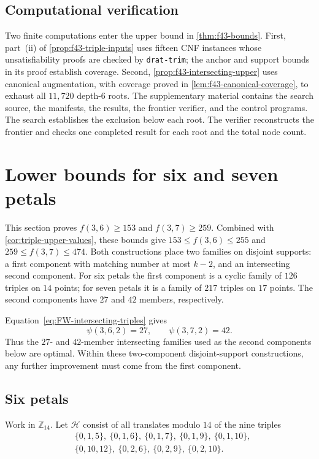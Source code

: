 \documentclass[11pt]{article}
\numberwithin{equation}{section}
\theoremstyle{definition}
\theoremstyle{remark}
\newcommand{\Hh}{\mathcal H}
\newcommand{\Z}{\mathbb Z}
\begin{document}
\subsection{Computational verification}

Two finite computations enter the upper bound in \cref{thm:f43-bounds}.
First, part~(ii) of \cref{prop:f43-triple-inputs} uses fifteen CNF instances
whose unsatisfiability proofs are checked by \texttt{drat-trim}; the anchor
and support bounds in its proof establish coverage. Second,
\cref{prop:f43-intersecting-upper} uses canonical augmentation, with coverage
proved in \cref{lem:f43-canonical-coverage}, to exhaust all $11{,}720$
depth-$6$ roots. The supplementary material contains the search source, the manifests, the
results, the frontier verifier, and the control programs.
The search establishes the exclusion below each root. The verifier
reconstructs the frontier and checks one completed result for each root and
the total node count.

\section{Lower bounds for six and seven petals}
\label{sec:triple-lower-six-seven}

This section proves $f(3,6)\ge153$ and $f(3,7)\ge259$. Combined with
\cref{cor:triple-upper-values}, these bounds give $153\le f(3,6)\le255$ and
$259\le f(3,7)\le474$. Both constructions place two families on disjoint
supports: a first component with matching number at most $k-2$, and an
intersecting second component. For six petals the first component is a
cyclic family of $126$ triples on $14$ points; for seven petals it is a
family of $217$ triples on $17$ points. The second components have $27$ and
$42$ members, respectively.

Equation~\eqref{eq:FW-intersecting-triples} gives
\[
 \psi(3,6,2)=27,
 \qquad
 \psi(3,7,2)=42.
\]
Thus the $27$- and $42$-member intersecting families used as the second
components below are optimal. Within these two-component disjoint-support
constructions, any further improvement must come from the first component.

\subsection{Six petals}

Work in $\Z_{14}$. Let $\Hh$ consist of all translates modulo $14$ of the
nine triples
\begin{equation}
\begin{split}
 &\{0,1,5\},\ \{0,1,6\},\ \{0,1,7\},\ \{0,1,9\},\ \{0,1,10\},\\
 &\{0,10,12\},\ \{0,2,6\},\ \{0,2,9\},\ \{0,2,10\}.
\end{split}
\label{eq:f36-seeds}
\end{equation}
\end{document}
